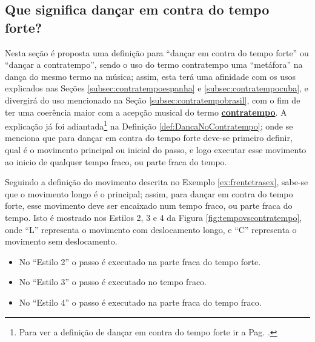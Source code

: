 \subsection{Que significa dançar em contra do tempo forte?}
Nesta seção é proposta uma definição para ``dançar em contra do tempo forte''  
ou ``dançar a contratempo'',
 sendo o uso do termo contratempo uma ``metáfora'' na dança do mesmo termo na música;
assim, esta terá uma afinidade  com os usos explicados nas 
Seções \ref{subsec:contratempoespanha} e \ref{subsec:contratempocuba},
e divergirá do uso mencionado na Seção \ref{subsec:contratempobrasil},
com o fim de ter uma coerência maior com a acepção musical do termo 
\hyperref[sec:contratempo]{\textbf{contratempo}}.
A explicação já foi adiantada\footnote{Para 
ver a definição de dançar em contra do tempo forte ir a Pag. \pageref{def:DancaNoContratempo}.}
 na Definição \ref{def:DancaNoContratempo};
onde se menciona que para dançar em contra do tempo forte deve-se primeiro definir,
 qual é o movimento principal ou inicial do passo,
e logo executar esse movimento ao inicio de qualquer tempo fraco, ou parte fraca do tempo.

\begin{example}
Seguindo a definição do movimento descrita no Exemplo \ref{ex:frentetrasex},
sabe-se que o movimento longo é o principal;
assim, para dançar em contra do tempo forte, esse movimento deve ser encaixado num tempo fraco,
ou parte fraca do tempo.
Isto é mostrado nos Estilos 2, 3 e 4 da Figura \ref{fig:tempovscontratempo},
onde ``L'' representa o movimento com deslocamento longo,
e ``C'' representa o movimento sem deslocamento.
\begin{itemize} 
\item No ``Estilo 2'' o passo é executado na parte fraca do tempo forte.
\item No ``Estilo 3'' o passo é executado no tempo fraco.
\item No ``Estilo 4'' o passo é executado na parte fraca do tempo fraco.
\end{itemize}
\end{example}
